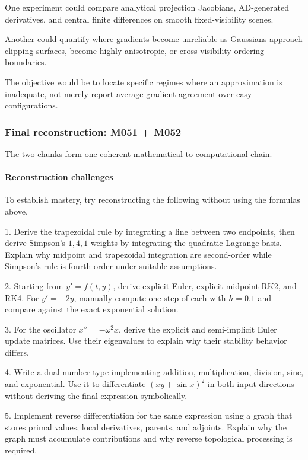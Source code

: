 One experiment could compare analytical projection Jacobians, AD-generated derivatives, and central finite differences on smooth fixed-visibility scenes.

Another could quantify where gradients become unreliable as Gaussians approach clipping surfaces, become highly anisotropic, or cross visibility-ordering boundaries.

The objective would be to locate specific regimes where an approximation is inadequate, not merely report average gradient agreement over easy configurations.

\subsubsection{Final reconstruction: M051 + M052}\label{final-reconstruction-m051-m052}

The two chunks form one coherent mathematical-to-computational chain.

\paragraph{Reconstruction challenges}\label{reconstruction-challenges}

To establish mastery, try reconstructing the following without using the formulas above.

1. Derive the trapezoidal rule by integrating a line between two endpoints, then derive Simpson's \(1,4,1\) weights by integrating the quadratic Lagrange basis. Explain why midpoint and trapezoidal integration are second-order while Simpson's rule is fourth-order under suitable assumptions.

2. Starting from \(y'=f(t,y)\), derive explicit Euler, explicit midpoint RK2, and RK4. For \(y'=-2y\), manually compute one step of each with \(h=0.1\) and compare against the exact exponential solution.

3. For the oscillator \(x''=-\omega^2x\), derive the explicit and semi-implicit Euler update matrices. Use their eigenvalues to explain why their stability behavior differs.

4. Write a dual-number type implementing addition, multiplication, division, sine, and exponential. Use it to differentiate \((xy+\sin x)^2\) in both input directions without deriving the final expression symbolically.

5. Implement reverse differentiation for the same expression using a graph that stores primal values, local derivatives, parents, and adjoints. Explain why the graph must accumulate contributions and why reverse topological processing is required.

